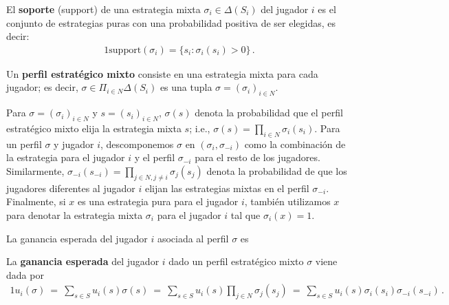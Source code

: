 \begin{definition}
El \textbf{soporte} (support) de una estrategia mixta $\sigma_i \in \Delta(S_i)$ del jugador $i$ es el conjunto de estrategias puras con una probabilidad positiva de ser elegidas, es decir:
\begin{alignat}{1}
\text{support}(\sigma_i) = \{s_i : \sigma_i(s_i) > 0 \} \,.
\end{alignat}
\end{definition}

\begin{definition}
Un \textbf{perfil estratégico mixto} consiste en una estrategia mixta para cada jugador; es decir, $\sigma \in \Pi_{i \in N} \Delta(S_i)$ es una tupla $\sigma=(\sigma_i)_{i \in N}$.
\end{definition}

Para $\sigma = (\sigma_i)_{i \in N}$ y $s = (s_i)_{i \in N}$, $\sigma(s)$ denota la probabilidad que el perfil estratégico mixto elija la estrategia mixta $s$; i.e., $\sigma(s)=\prod_{i\in N} \sigma_i(s_i)$. Para un perfil $\sigma$ y jugador $i$, descomponemos $\sigma$ en $(\sigma_i,\sigma_{-i})$ como la combinación de la estrategia para el jugador $i$ y el perfil $\sigma_{-i}$ para el resto de los jugadores. Similarmente, $\sigma_{-i}(s_{-i})=\prod_{j\in N,j\neq i}\sigma_j(s_j)$ denota la probabilidad de que los jugadores diferentes al jugador $i$ elijan las estrategias mixtas en el perfil $\sigma_{-i}$. Finalmente, si $x$ es una estrategia pura para el jugador $i$, también utilizamos $x$ para denotar la estrategia mixta $\sigma_i$ para el jugador $i$ tal que $\sigma_i(x)=1$.

La ganancia esperada del jugador $i$ asociada al perfil $\sigma$ es

\begin{definition}
\label{def:ganancia-esperada}
La \textbf{ganancia esperada} del jugador $i$ dado un perfil estratégico mixto $\sigma$ viene dada por
\begin{alignat}{1}
	u_i(\sigma)\ =\ \sum_{s \in S} u_i(s) \sigma(s)\ =\ \sum_{s \in S} u_i(s) \prod _{j \in N} \sigma_j(s_j)\ =\ \sum_{s \in S} u_i(s) \sigma_i(s_i) \sigma_{-i}(s_{-i})\,.
\end{alignat}
\end{definition}


